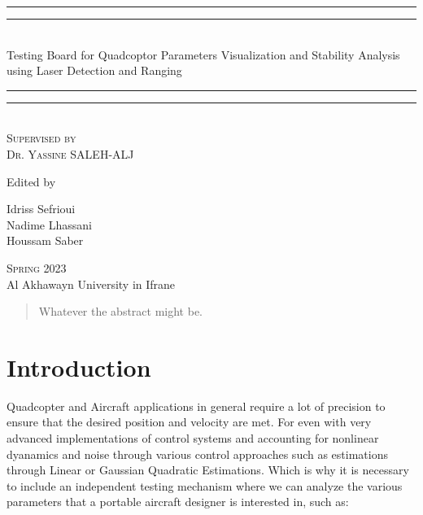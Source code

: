 \documentclass[12pt]{article}
\numberwithin{equation}{section}
\begin{document}
\begin{titlepage}


    \centering
    \vspace*{\baselineskip}
    \rule{\textwidth}{1.6pt}\vspace*{-\baselineskip}\vspace*{2pt}
    \rule{\textwidth}{0.4pt}\\[\baselineskip]
    {\LARGE Testing Board for Quadcoptor Parameters Visualization and Stability Analysis using Laser Detection and Ranging} 
    \rule{\textwidth}{0.4pt}\vspace*{-\baselineskip}\vspace{3.2pt}
    \rule{\textwidth}{1.6pt}\\[\baselineskip]
    \scshape
    Supervised by \\[\baselineskip] {\Large Dr. Yassine SALEH-ALJ}\par
    \vspace*{2\baselineskip}
    Edited by \\[\baselineskip]
    {\Large Idriss Sefrioui \\ Nadime Lhassani \\ Houssam Saber\par}
    \vfill
    {\scshape Spring 2023} \\
    {\large Al Akhawayn University in Ifrane}\par
  \end{titlepage}

\begin{abstract}
  Whatever the abstract might be.
\end{abstract}

\newpage

\tableofcontents
\newpage
\listoffigures
\newpage

\section{Introduction}

Quadcopter and Aircraft applications in general require a lot of precision to ensure that the desired position and velocity are met. For even with very advanced implementations of control systems and accounting for nonlinear dyanamics and noise through various control approaches such as estimations through Linear or Gaussian Quadratic Estimations. Which is why it is necessary to include an independent testing mechanism where we can analyze the various parameters that a portable aircraft designer is interested in, such as:
\end{document}
